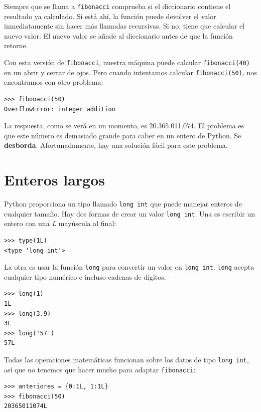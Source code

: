 Siempre que se llama a \texttt{fibonacci} comprueba si el diccionario
contiene el resultado ya calculado. Si está ahí, la función puede
devolver el valor inmediatamente sin hacer más llamadas recursivas.
Si no, tiene que calcular el nuevo valor. El nuevo valor se añade
al diccionario antes de que la función retorne.

Con esta versión de \texttt{fibonacci}, nuestra máquina puede calcular
\texttt{fibonacci(40)} en un abrir y cerrar de ojos. Pero cuando intentamos
calcular \texttt{fibonacci(50)}, nos encontramos con otro problema:

 

\begin{verbatim}
>>> fibonacci(50)
OverflowError: integer addition
\end{verbatim}

La respuesta, como se verá en un momento, es 20.365.011.074. El problema
es que este número es demasiado grande para caber en un entero de
Python. Se \textbf{desborda}. Afortunadamente, hay una solución fácil
para este problema.

\section{Enteros largos}

  

Python proporciona un tipo llamado \texttt{long int} que puede manejar
enteros de cualquier tamaño. Hay dos formas de crear un valor \texttt{long
int}. Una es escribir un entero con una {\em L} mayúscula al final:

\begin{verbatim}
>>> type(1L)
<type 'long int'>
\end{verbatim}
 La otra es usar la función \texttt{long} para convertir un valor
en \texttt{long int}. \texttt{long} acepta cualquier tipo numérico
e incluso cadenas de dígitos:
\begin{verbatim}
>>> long(1)
1L
>>> long(3.9)
3L
>>> long('57')
57L
\end{verbatim}

Todas las operaciones matemáticas funcionan sobre los datos de tipo
\texttt{long int}, así que no tenemos que hacer mucho para adaptar
\texttt{fibonacci}:
\begin{verbatim}
>>> anteriores = {0:1L, 1:1L}
>>> fibonacci(50)
20365011074L
\end{verbatim}

